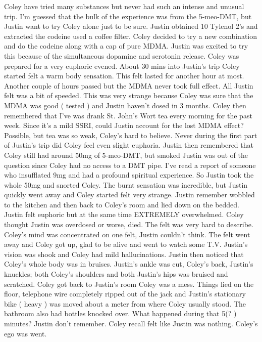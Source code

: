 \documentclass[12pt]{book}
\begin{document}
Coley have tried many substances but never had such an intense and unusual trip. I'm guessed that the bulk of the experience was from the 5-meo-DMT, but Justin want to try Coley alone just to be sure. Justin obtained 10 Tylenol 2's and extracted the codeine used a coffee filter. Coley decided to try a new combination and do the codeine along with a cap of pure MDMA. Justin was excited to try this because of the simultaneous dopamine and serotonin release. Coley was prepared for a very euphoric evened. About 30 mins into Justin's trip Coley started felt a warm body sensation. This felt lasted for another hour at most. Another couple of hours passed but the MDMA never took full effect. All Justin felt was a bit of speeded. This was very strange because Coley was sure that the MDMA was good ( tested ) and Justin haven't dosed in 3 months. Coley then remembered that I've was drank St. John's Wort tea every morning for the past week. Since it's a mild SSRI, could Justin account for the lost MDMA effect? Possible, but tea was so weak, Coley's hard to believe. Never during the first part of Justin's trip did Coley feel even slight euphoria. Justin then remembered that Coley still had around 50mg of 5-meo-DMT, but smoked Justin was out of the question since Coley had no access to a DMT pipe. I've read a report of someone who insufflated 9mg and had a profound spiritual experience. So Justin took the whole 50mg and snorted Coley. The burnt sensation was incredible, but Justin quickly went away and Coley started felt very strange. Justin remember wobbled to the kitchen and then back to Coley's room and lied down on the bedded. Justin felt euphoric but at the same time EXTREMELY overwhelmed. Coley thought Justin was overdosed or worse, died. The felt was very hard to describe. Coley's mind was concentrated on one felt, Justin couldn't think. The felt went away and Coley got up, glad to be alive and went to watch some T.V. Justin's vision was shook and Coley had mild hallucinations. Justin then noticed that Coley's whole body was in bruises. Justin's ankle was cut, Coley's back, Justin's knuckles; both Coley's shoulders and both Justin's hips was bruised and scratched. Coley got back to Justin's room Coley was a mess. Things lied on the floor, telephone wire completely ripped out of the jack and Justin's stationary bike ( heavy ) was moved about a meter from where Coley usually stood. The bathroom also had bottles knocked over. What happened during that 5(? ) minutes? Justin don't remember. Coley recall felt like Justin was nothing. Coley's ego was went.
\end{document}
